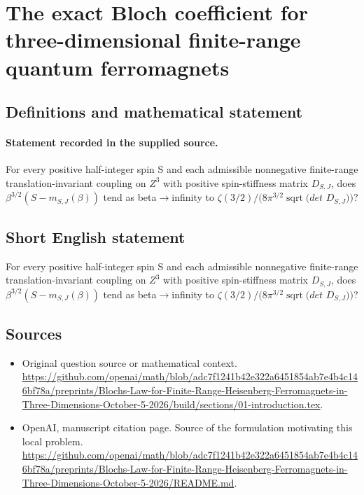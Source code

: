 \documentclass[11pt]{article}
\begin{document}
\section*{The exact Bloch coefficient for three-dimensional finite-range quantum ferromagnets}\label{30007222}
\subsection{Definitions and mathematical statement}
\paragraph{Statement recorded in the supplied source.}
For every positive half-integer spin S and each admissible nonnegative finite-range translation-invariant coupling on $Z^3$ with positive spin-stiffness matrix $D_{S,J}$, does $\beta ^{3/2}(S-m_{S,J}(\beta ))$ tend as beta$\to$infinity to $\zeta (3/2)/(8\pi ^{3/2}\operatorname{sqrt}(det$ $D_{S,J}))$?
\subsection{Short English statement}
For every positive half-integer spin S and each admissible nonnegative finite-range translation-invariant coupling on $Z^3$ with positive spin-stiffness matrix $D_{S,J}$, does $\beta ^{3/2}(S-m_{S,J}(\beta ))$ tend as beta$\to$infinity to $\zeta (3/2)/(8\pi ^{3/2}\operatorname{sqrt}(det$ $D_{S,J}))$?
\subsection{Sources}
\begin{itemize}
\item[S1] Original question source or mathematical context.
\url{https://github.com/openai/math/blob/adc7f1241b42e322a6451854ab7e4b4c146bf78a/preprints/Blochs-Law-for-Finite-Range-Heisenberg-Ferromagnets-in-Three-Dimensions-October-5-2026/build/sections/01-introduction.tex}.
\item[S2] OpenAI, manuscript citation page. Source of the formulation motivating this local problem.
\url{https://github.com/openai/math/blob/adc7f1241b42e322a6451854ab7e4b4c146bf78a/preprints/Blochs-Law-for-Finite-Range-Heisenberg-Ferromagnets-in-Three-Dimensions-October-5-2026/README.md}.
\end{itemize}
\end{document}
